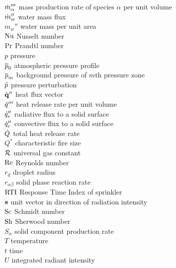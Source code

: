 \documentclass[11pt]{book}
\begin{document}
\begin{tabbing}
$\dot{m}_\alpha'''$           \> mass production rate of species $\alpha$ per unit volume \\
$\dot{m}_w''$                 \> water mass flux  \\
$m_w''$                   \> water mass per unit area \\
$\hbox{Nu}$                     \> Nusselt number \\
$\hbox{Pr}$                     \> Prandtl number \\
$p$                       \> pressure \\
$\overline{p}_0$                   \> atmospheric pressure profile \\
$\overline{p}_m$                   \> background pressure of $m$th pressure zone \\
$\tilde{p}$                     \> pressure perturbation \\
$\dot{\bf q}''$                  \> heat flux vector \\
$\dot{q}'''$                  \> heat release rate per unit volume \\
$\dot{q}_r''$                 \> radiative flux to a solid surface \\
$\dot{q}_c''$                 \> convective flux to a solid surface \\
$\dot{Q}$                     \> total heat release rate \\
$Q^*$                     \> characteristic fire size \\
${\cal R}$                      \> universal gas constant \\
$\hbox{Re}$                     \> Reynolds number \\
$r_d$                     \> droplet radius \\
$r_{\alpha\beta}$     \> solid phase reaction rate \\
$\hbox{RTI}$              \> Response Time Index of sprinkler \\
${\bf s}$                     \> unit vector in direction of radiation intensity\\
$\hbox{Sc}$                     \> Schmidt number \\
$\hbox{Sh}$                     \> Sherwood number \\
$S_\alpha$        \> solid component production rate \\
$T$                       \> temperature \\
$t$                       \> time           \\
$U$                       \> integrated radiant intensity \\

\end{tabbing}
\end{document}
